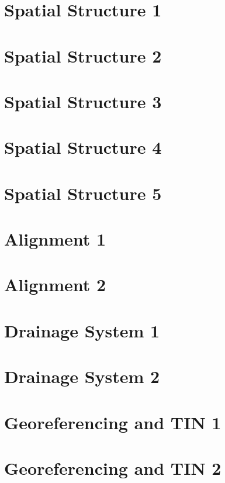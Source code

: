 \documentclass{scrartcl}
\begin{document}
\section{Spatial Structure 1}
\label{sec:spatial_1}
\clearpage

\section{Spatial Structure 2}
\label{sec:spatial_2}
\clearpage

\section{Spatial Structure 3}
\label{sec:spatial_3}
\clearpage

\section{Spatial Structure 4}
\label{sec:spatial_4}
\clearpage

\section{Spatial Structure 5}
\label{sec:spatial_5}
\clearpage


\section{Alignment 1}
\label{sec:alignment_12d_1}
\clearpage

\section{Alignment 2}
\label{sec:alignment_12d_2}
\clearpage



\section{Drainage System 1}
\label{sec:drainage_1}
\clearpage

\section{Drainage System 2}
\label{sec:drainage_2}
\clearpage


\section{Georeferencing and TIN 1}
\label{sec:georef_tin_1}
\clearpage

\section{Georeferencing and TIN 2}
\label{sec:georef_tin_2}
\clearpage
\end{document}
